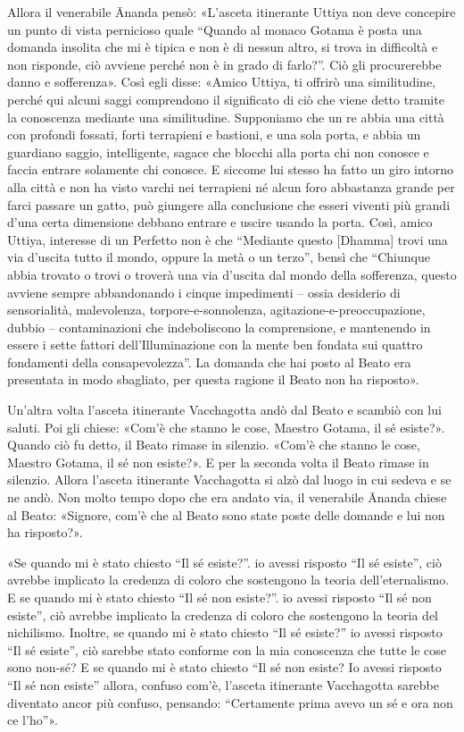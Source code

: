 Allora il venerabile Ānanda pensò: «L’asceta itinerante Uttiya non deve
concepire un punto di vista pernicioso quale “Quando al monaco Gotama è posta
una domanda insolita che mi è tipica e non è di nessun altro, si trova in
difficoltà e non risponde, ciò avviene perché non è in grado di farlo?”. Ciò gli
procurerebbe danno e sofferenza». Così egli disse: «Amico Uttiya, ti offrirò una
similitudine, perché qui alcuni saggi comprendono il significato di ciò che
viene detto tramite la conoscenza mediante una similitudine. Supponiamo che un
re abbia una città con profondi fossati, forti terrapieni e bastioni, e una sola
porta, e abbia un guardiano saggio, intelligente, sagace che blocchi alla porta
chi non conosce e faccia entrare solamente chi conosce. E siccome lui stesso ha
fatto un giro intorno alla città e non ha visto varchi nei terrapieni né alcun
foro abbastanza grande per farci passare un gatto, può giungere alla conclusione
che esseri viventi più grandi d’una certa dimensione debbano entrare e uscire
usando la porta. Così, amico Uttiya, interesse di un Perfetto non è che
“Mediante questo [Dhamma] trovi una via d’uscita tutto il mondo, oppure la metà
o un terzo”, bensì che “Chiunque abbia trovato o trovi o troverà una via
d’uscita dal mondo della sofferenza, questo avviene sempre abbandonando i cinque
impedimenti – ossia desiderio di sensorialità, malevolenza,
torpore-e-sonnolenza, agitazione-e-preoccupazione, dubbio – contaminazioni che
indeboliscono la comprensione, e mantenendo in essere i sette fattori
dell’Illuminazione con la mente ben fondata sui quattro fondamenti della
consapevolezza”. La domanda che hai posto al Beato era presentata in modo
sbagliato, per questa ragione il Beato non ha risposto».


Un’altra volta l’asceta itinerante Vacchagotta andò dal Beato e scambiò con lui
saluti. Poi gli chiese: «Com’è che stanno le cose, Maestro Gotama, il sé
esiste?». Quando ciò fu detto, il Beato rimase in silenzio. «Com’è che stanno le
cose, Maestro Gotama, il sé non esiste?». E per la seconda volta il Beato rimase
in silenzio. Allora l’asceta itinerante Vacchagotta si alzò dal luogo in cui
sedeva e se ne andò. Non molto tempo dopo che era andato via, il venerabile
Ānanda chiese al Beato: «Signore, com’è che al Beato sono state poste delle
domande e lui non ha risposto?».

«Se quando mi è stato chiesto “Il sé esiste?”. io avessi risposto “Il sé
esiste”, ciò avrebbe implicato la credenza di coloro che sostengono la teoria
dell’eternalismo. E se quando mi è stato chiesto “Il sé non esiste?”. io avessi
risposto “Il sé non esiste”, ciò avrebbe implicato la credenza di coloro che
sostengono la teoria del nichilismo. Inoltre, se quando mi è stato chiesto “Il
sé esiste?” io avessi risposto “Il sé esiste”, ciò sarebbe stato conforme con la
mia conoscenza che tutte le cose sono non-sé? E se quando mi è stato chiesto “Il
sé non esiste? Io avessi risposto “Il sé non esiste” allora, confuso com’è,
l’asceta itinerante Vacchagotta sarebbe diventato ancor più confuso, pensando:
“Certamente prima avevo un sé e ora non ce l’ho”».

